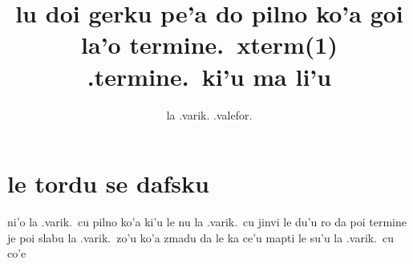\documentclass{article}
\title{lu doi gerku pe'a do pilno ko'a goi la'o termine.\ xterm(1) .termine.\ ki'u ma li'u}
\author{la .varik. .valefor.}
\begin{document}
\maketitle

\section{le tordu se dafsku}
ni'o la .varik.\ cu pilno ko'a ki'u le nu la .varik.\ cu jinvi le du'u ro da poi termine je poi slabu la .varik.\ zo'u ko'a zmadu da le ka ce'u mapti le su'u la .varik.\ cu co'e
\end{document}
